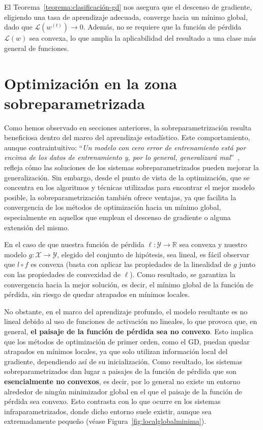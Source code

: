 El Teorema~\ref{teorema:clasificación-gd} nos asegura que el descenso de gradiente, eligiendo una tasa de aprendizaje adecuada, converge hacia un mínimo global, dado que $\mathcal{L}(w^{(t)}) \to 0$. Además, no se requiere que la función de pérdida $\mathcal{L}(w)$ sea convexa, lo que amplia la aplicabilidad del resultado a una clase más general de funciones.

\section{Optimización en la zona sobreparametrizada}\label{sec:optimizacion-zona-sobreparametrizada}
Como hemos observado en secciones anteriores, la sobreparametrización resulta beneficiosa dentro del marco del aprendizaje estadístico. Este comportamiento, aunque contraintuitivo: ``\textit{Un modelo con cero error de entrenamiento está por encima de los datos de entrenamiento y, por lo general, generalizará mal}''~\cite{Hastie2001}, refleja cómo las soluciones de los sistemas sobreparametrizados pueden mejorar la generalización. Sin embargo, desde el punto de vista de la optimización, que se concentra en los algoritmos y técnicas utilizadas para encontrar el mejor modelo posible, la sobreparametrización también ofrece ventajas, ya que facilita la convergencia de los métodos de optimización hacia un mínimo global, especialmente en aquellos que emplean el descenso de gradiente o alguna extensión del mismo.

En el caso de que nuestra función de pérdida $\ell: \mathcal{Y} \to \mathbb{R}$ sea convexa y nuestro modelo $g: \mathcal{X} \to \mathcal{Y}$, elegido del conjunto de hipótesis, sea lineal, es fácil observar que $l \circ f$ es convexa (basta con aplicar las propiedades de la linealidad de $g$ junto con las propiedades de convexidad de $\ell$). Como resultado, se garantiza la convergencia hacia la mejor solución, es decir, el mínimo global de la función de pérdida, sin riesgo de quedar atrapados en mínimos locales.

No obstante, en el marco del aprendizaje profundo, el modelo resultante es no lineal debido al uso de funciones de activación no lineales, lo que provoca que, en general, \textbf{el paisaje de la función de pérdida sea no convexo}. Esto implica que los métodos de optimización de primer orden, como el GD, puedan quedar atrapados en mínimos locales, ya que solo utilizan información local del gradiente, dependiendo así de su inicialización. Como resultado, los sistemas sobreparametrizados dan lugar a paisajes de la función de pérdida que son \textbf{esencialmente no convexos}, es decir, por lo general no existe un entorno alrededor de ningún minimizador global en el que el paisaje de la función de pérdida sea convexo. Esto contrasta con lo que ocurre en los sistemas infraparametrizados, donde dicho entorno suele existir, aunque sea extremadamente pequeño (véase Figura~\ref{fig:localglobalminima}).

